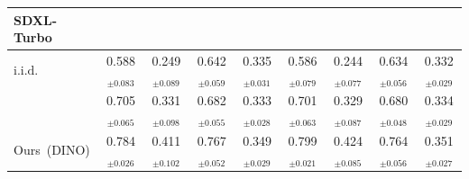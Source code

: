 \documentclass[10pt,twocolumn,letterpaper]{article}
\newcommand{\ours}{Ours}
\begin{document}
\begin{table}[h]
{\begin{tabular}{lcccc|cccc}
 \textbf{SDXL-Turbo}~\cite{sdxlturbo} & & & &&&&& \\  
 \midrule%
 $\text{i.i.d.}$  &  0.588$_{\pm 0.083}$ & 0.249$_{\pm 0.089}$ & 0.642$_{\pm 0.059}$ & 0.335$_{\pm 0.031}$  &  0.586$_{\pm 0.079}$ & 0.244$_{\pm 0.077}$ & 0.634$_{\pm 0.056}$ & 0.332$_{\pm 0.029}$  \\
  \citet{gi}  & 0.705$_{\pm 0.065}$ & 0.331$_{\pm 0.098}$ & 0.682$_{\pm 0.055}$ & 0.333$_{\pm 0.028}$ & 0.701$_{\pm 0.063}$ & 0.329$_{\pm 0.087}$ & 0.680$_{\pm 0.048}$ & 0.334$_{\pm 0.029}$ \\
  \ours\ (DINO) &  0.784$_{\pm 0.026}$ & 0.411$_{\pm 0.102}$ & 0.767$_{\pm 0.052}$ & 0.349$_{\pm 0.029}$  &  0.799$_{\pm 0.021}$ & 0.424$_{\pm 0.085}$ & 0.764$_{\pm 0.056}$ & 0.351$_{\pm 0.027}$  \\
  \bottomrule
  \bottomrule

\end{tabular}%
}

\label{tab:supp_main_table}
\end{table}
\end{document}
